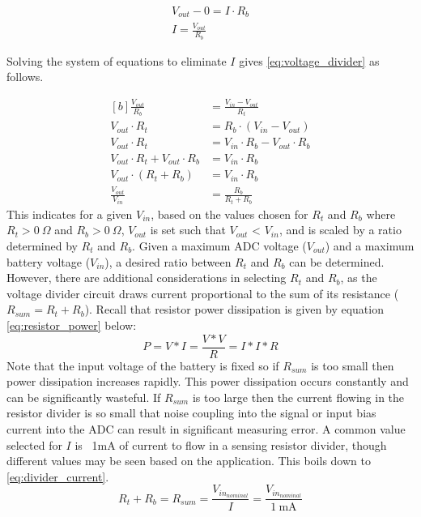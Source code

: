 \documentclass[main.tex]{subfiles}
\begin{document}
\begin{equation}
    \begin{aligned}
        V_{out} - 0 = I \cdot R_b \\
        I = \frac{V_{out}}{R_b}
    \end{aligned}
    \label{eq:ohms_law_bot}
\end{equation}

\noindent Solving the system of equations to eliminate $I$ gives \eqref{eq:voltage_divider} as follows. 

\begin{equation}
    \begin{aligned}[b]
        \frac{V_{out}}{R_b} &= \frac{V_{in} - V_{out}}{R_t} \\
        V_{out} \cdot R_t &= R_b \cdot (V_{in} - V_{out}) \\
        V_{out} \cdot R_t &= V_{in} \cdot R_b - V_{out} \cdot R_b \\
        V_{out} \cdot R_t + V_{out} \cdot R_b &= V_{in} \cdot R_b \\
        V_{out} \cdot (R_t + R_b) &= V_{in} \cdot R_b \\
        \frac{V_{out}}{V_{in}} &= \frac{R_b}{R_t + R_b}
    \end{aligned}
    \label{eq:voltage_divider}
\end{equation}
This indicates for a given $V_{in}$, based on the values chosen for $R_t$ and $R_b$ where $R_t > 0 \ \Omega$ and $R_b > 0 \ \Omega$, $V_{out}$ is set such that $V_{out}$ < $V_{in}$, and is scaled by a ratio determined by $R_t$ and $R_b$. Given a maximum ADC voltage ($V_{out}$) and a maximum battery voltage ($V_{in}$), a desired ratio between $R_t$ and $R_b$ can be determined. However, there are additional considerations in selecting $R_t$ and $R_b$, as the voltage divider circuit draws current proportional to the sum of its resistance ($R_{sum} = R_{t} + R_{b}$). Recall that resistor power dissipation is given by equation \ref{eq:resistor_power} below:
\begin{equation} %
    P = V * I = \frac{V * V}{R} = I * I * R 
    \label{eq:resistor_power}
\end{equation} 
Note that the input voltage of the battery is fixed so if $R_{sum}$ is too small then power dissipation increases rapidly. This power dissipation occurs constantly and can be significantly wasteful. If $R_{sum}$ is too large then the current flowing in the resistor divider is so small that noise coupling into the signal or input bias current into the ADC can result in significant measuring error. A common value selected for $I$ is ~1mA of current to flow in a sensing resistor divider, though different values may be seen based on the application. This boils down to \eqref{eq:divider_current}. 
\begin{equation} %
    R_t + R_b = R_{sum} = \frac{V_{in_{nominal}}}{I} = \frac{V_{in_{nominal}}}{1 \ \mathrm{mA}}
    \label{eq:divider_current}
\end{equation} 
\end{document}
